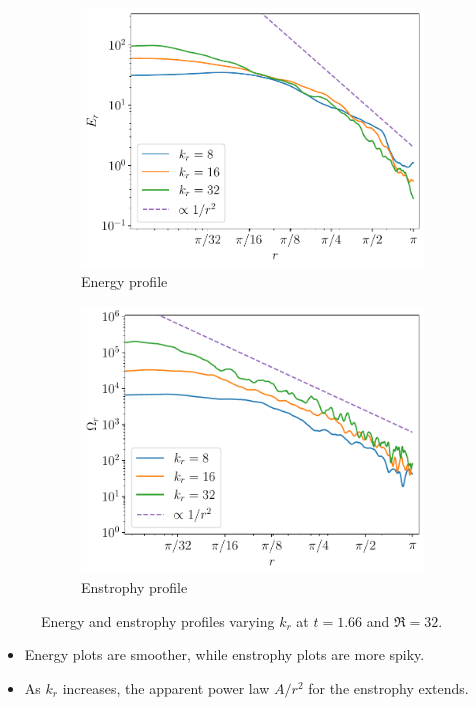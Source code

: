 \documentclass{beamer} %
\begin{document}
\begin{frame}
	\begin{figure}[!ht]
		\centering
		\begin{subfigure}{0.44\textwidth}
			\centering
			\includegraphics[width=\textwidth]{../images/Energy_kdn.test7.059.pdf}
			\caption{Energy profile}
		\end{subfigure}\hspace{0.04\textwidth}
		\begin{subfigure}{0.44\textwidth}
			\centering
			\includegraphics[width=\textwidth]{../images/Enstrophy_kdn.test7.059.pdf}
			\caption{Enstrophy profile}
		\end{subfigure}
		\caption{Energy and enstrophy profiles varying $k_r$ at $t=1.66$ and $\Re=32$.}
	\end{figure}
	\begin{itemize}
		\item Energy plots are smoother, while enstrophy plots are more spiky.
		\item As $k_r$ increases, the apparent power law $A/r^2$ for the enstrophy extends.
	\end{itemize}
\end{frame}
\end{document}
